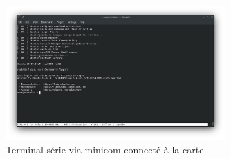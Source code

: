 \begin{figure}[H]
    \centering
    \includegraphics[width=0.75\textwidth]{Images/CaptureTerminalMinicom.png}
    \caption{Terminal série via minicom connecté à la carte}
    \label{fig:terminal}
\end{figure}

